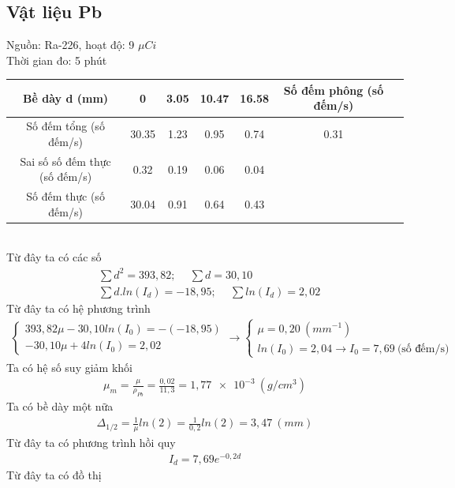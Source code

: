 \documentclass{article}
\begin{document}
\subsection{Vật liệu Pb}
Nguồn: Ra-226, hoạt độ: 9 $\mu Ci$ \\
Thời gian đo: 5 phút \\
\begin{table}[!ht]
    \centering
    \begin{tabular}{|c|c|c|c|c|c|c|}
    \hline
        Bề dày d (mm) & 0 & 3.05 & 10.47 & 16.58 & Số đếm phông (số đếm/s)  \\ \hline
        Số đếm tổng (số đếm/s) & 30.35 & 1.23 & 0.95 & 0.74 & 0.31   \\ \hline
        Sai số số đếm thực (số đếm/s) & 0.32 & 0.19 & 0.06 & 0.04 &  \\ \hline
        Số đếm thực (số đếm/s) & 30.04 & 0.91 & 0.64 & 0.43  & \\ \hline
    \end{tabular}
\end{table}\\
Từ đây ta có các số
\begin{align*}
	& \sum{d^2} = 393,82; \ \quad \sum{d} = 30,10 \\
	& \sum{d.ln(I_d)} = -18,95; \ \quad \sum{ln(I_d)} = 2,02
\end{align*}
Từ đây ta có hệ phương trình
\begin{align*}
	\begin{cases}
	393,82\mu - 30,10ln(I_0) = - (-18,95) \\ 
	-30,10\mu + 4ln(I_0) =  2,02
	\end{cases}
	\rightarrow
	\begin{cases}
	\mu = 0,20\ (mm^{-1}) \\
	ln(I_0) = 2,04 \rightarrow I_0 = 7,69 \ \text{(số đếm/s)}
	\end{cases}
\end{align*}
Ta có hệ số suy giảm khối
\begin{align*}
	\mu_m = \frac{\mu}{\rho_{Pb}} = \frac{0,02}{11,3} = 1,\num{77e-3} \ (g/cm^3)
\end{align*}
Ta có bề dày một nữa
\begin{align*}
	\Delta_{1/2} = \frac{1}{\mu}ln(2) = \frac{1}{0,2}ln(2) = 3,47 \ (mm)
\end{align*}
Từ đây ta có phương trình hồi quy
\begin{align*}
	I_d = 7,69e^{-0,2d}
\end{align*}
Từ đây ta có đồ thị
\end{document}
